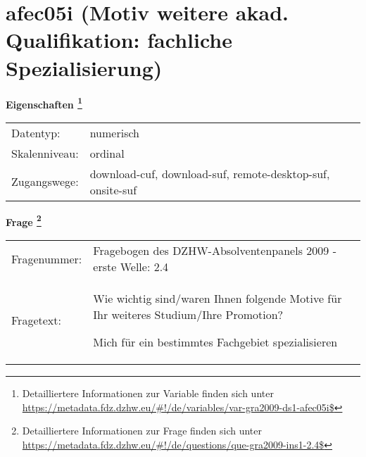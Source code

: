 
    \setcounter{footnote}{0}

    \vspace*{-1.8cm}
	\section{afec05i (Motiv weitere akad. Qualifikation: fachliche Spezialisierung)}
	\label{section:afec05i}



    \vspace*{0.5cm}
    \noindent\textbf{Eigenschaften
	\footnote{Detailliertere Informationen zur Variable finden sich unter
		\url{https://metadata.fdz.dzhw.eu/\#!/de/variables/var-gra2009-ds1-afec05i$}}}\\
	\begin{tabularx}{\hsize}{@{}lX}
	Datentyp: & numerisch \\
	Skalenniveau: & ordinal \\
	Zugangswege: &
	  download-cuf, 
	  download-suf, 
	  remote-desktop-suf, 
	  onsite-suf
 \\
    \end{tabularx}



				\vspace*{0.5cm}
                \noindent\textbf{Frage
	                \footnote{Detailliertere Informationen zur Frage finden sich unter
		              \url{https://metadata.fdz.dzhw.eu/\#!/de/questions/que-gra2009-ins1-2.4$}}}\\
				\begin{tabularx}{\hsize}{@{}lX}
					Fragenummer: &
					  Fragebogen des DZHW-Absolventenpanels 2009 - erste Welle:
					  2.4
 \\
					Fragetext: & Wie wichtig sind/waren Ihnen folgende Motive für Ihr weiteres Studium/Ihre Promotion?\par  Mich für ein bestimmtes Fachgebiet spezialisieren \\
				\end{tabularx}





